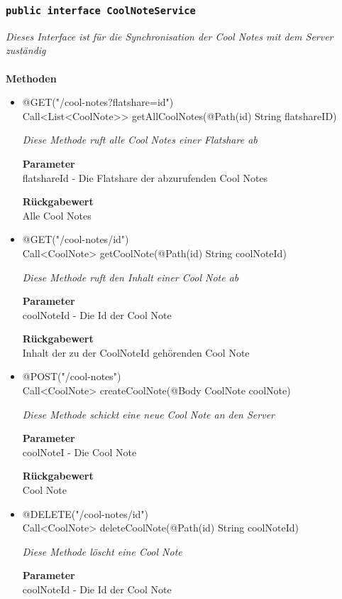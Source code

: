 	\subsubsection{\texttt{public interface CoolNoteService }}
\textit{Dieses Interface ist für die Synchronisation der Cool Notes mit dem Server zuständig}\\
\\
	\textbf{Methoden} \\
		\begin{itemize}
		\item{@GET("/cool-notes?flatshare={id}")\\ Call<List<CoolNote>> getAllCoolNotes(@Path(\grqq id\grqq) String flatshareID)} 

		\textit{Diese Methode ruft alle Cool Notes einer Flatshare ab}

		\textbf{Parameter} \\
	flatshareId - Die Flatshare der abzurufenden Cool Notes

		\textbf{Rückgabewert} \\
	Alle Cool Notes

      \item{@GET("/cool-notes/{id}")\\ Call<CoolNote> getCoolNote(@Path(\grqq id\grqq) String coolNoteId)}

		\textit{Diese Methode ruft den Inhalt einer Cool Note ab }

		\textbf{Parameter} \\
		coolNoteId - Die Id der Cool Note 

		\textbf{Rückgabewert} \\
	Inhalt der zu der CoolNoteId gehörenden Cool Note

      \item{@POST("/cool-notes")\\ Call<CoolNote> createCoolNote(@Body CoolNote coolNote)}

		\textit{Diese Methode schickt eine neue Cool Note an den Server }

		\textbf{Parameter} \\
		coolNoteI - Die Cool Note 

		\textbf{Rückgabewert} \\
	Cool Note


      \item{@DELETE("/cool-notes/{id}")\\ Call<CoolNote> deleteCoolNote(@Path(\grqq id\grqq) String coolNoteId)}

		\textit{Diese Methode löscht eine Cool Note }

		\textbf{Parameter} \\
		coolNoteId - Die Id der Cool Note 


	 \end{itemize}


